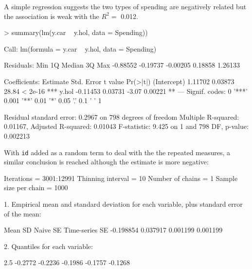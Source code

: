 \documentclass{article}
\begin{document}
A simple regression suggests the two types of spending are negatively related but the association is weak with the $R^{2}=$ 0.012.

\begin{Schunk}
\begin{Sinput}
> summary(lm(y.car ~ y.hol, data = Spending))
\end{Sinput}
\begin{Soutput}
Call:
lm(formula = y.car ~ y.hol, data = Spending)

Residuals:
     Min       1Q   Median       3Q      Max 
-0.88552 -0.19737 -0.00205  0.18858  1.26133 

Coefficients:
            Estimate Std. Error t value Pr(>|t|)    
(Intercept)  1.11702    0.03873   28.84  < 2e-16 ***
y.hol       -0.11453    0.03731   -3.07  0.00221 ** 
---
Signif. codes:  
0 '***' 0.001 '**' 0.01 '*' 0.05 '.' 0.1 ' ' 1

Residual standard error: 0.2967 on 798 degrees of freedom
Multiple R-squared:  0.01167,	Adjusted R-squared:  0.01043 
F-statistic: 9.425 on 1 and 798 DF,  p-value: 0.002213
\end{Soutput}
\end{Schunk}

With \texttt{id} added as a random term to deal with the the repeated measures, a similar conclusion is reached although the estimate is more negative:

\iftalk
\else
\fi

\begin{Schunk}
\begin{Soutput}
Iterations = 3001:12991
Thinning interval = 10 
Number of chains = 1 
Sample size per chain = 1000 

1. Empirical mean and standard deviation for each variable,
   plus standard error of the mean:

          Mean             SD       Naive SE Time-series SE 
     -0.198854       0.037917       0.001199       0.001199 

2. Quantiles for each variable:

   2.5%
-0.2772 -0.2236 -0.1986 -0.1757 -0.1268 
\end{Soutput}
\end{Schunk}
\end{document}
